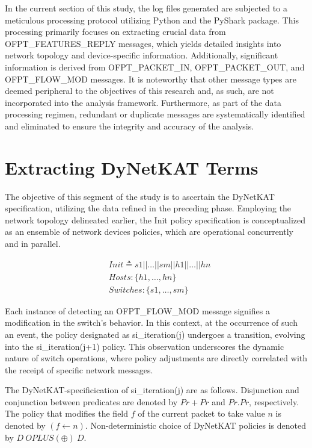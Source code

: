 \documentclass[english,10pt]{article}
\begin{document}
In the current section of this study, the log files generated are subjected to a meticulous processing protocol utilizing Python and the PyShark package. This processing primarily focuses on extracting crucial data from OFPT\_FEATURES\_REPLY messages, which yields detailed insights into network topology and device-specific information. Additionally, significant information is derived from OFPT\_PACKET\_IN, OFPT\_PACKET\_OUT, and OFPT\_FLOW\_MOD messages. It is noteworthy that other message types are deemed peripheral to the objectives of this research and, as such, are not incorporated into the analysis framework.
Furthermore, as part of the data processing regimen, redundant or duplicate messages are systematically identified and eliminated to ensure the integrity and accuracy of the analysis. 


\section{Extracting DyNetKAT Terms}

The objective of this segment of the study is to ascertain the DyNetKAT specification, utilizing the data refined in the preceding phase. Employing the network topology delineated earlier, the Init policy specification is conceptualized as an ensemble of network devices policies, which are operational concurrently and in parallel. 

\[
\begin{aligned}
&Init \triangleq s1 || \ldots || sm || h1 || \ldots || hn \\
&Hosts: \{h1, \ldots, hn\}
\\
&Switches: \{s1, \ldots, sm\}
\end{aligned}\]


Each instance of detecting an OFPT\_FLOW\_MOD message signifies a modification in the switch's behavior. In this context, at the occurrence of such an event, the policy designated as si\_iteration(j) undergoes a transition, evolving into the si\_iteration(j+1) policy. This observation underscores the dynamic nature of switch operations, where policy adjustments are directly correlated with the receipt of specific network messages.


The DyNetKAT-specificication of  si\_iteration(j) are as follows.
Disjunction and conjunction between predicates are denoted by $Pr + Pr $ and $Pr . Pr$, respectively.
The policy that modifies the field $f$ of the current packet to take value $n$ is denoted by $(f \leftarrow n)$. Non-deterministic choice of DyNetKAT policies is denoted by $D\ OPLUS (\oplus)\ D$.
\end{document}
